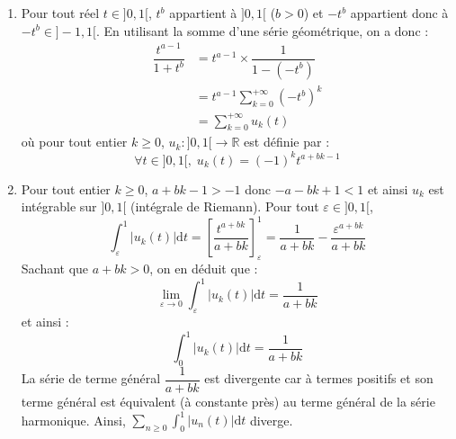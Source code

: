 \documentclass[a4paper,twoside,french,10pt]{VcCours}
\newcommand{\dt}{\text{d}t}
\begin{document}
\begin{enumerate}
\item Pour tout réel $t \in ]0,1[$, $t^b$ appartient à $]0,1[$ ($b>0$) et $-t^b$ appartient donc à $-t^b \in ]-1,1[$. En utilisant la somme d'une série géométrique, on a donc :
\begin{align*}
\dfrac{t^{a-1}}{1+t^b} & = t^{a-1} \times \dfrac{1}{1-(-t^b)} \\
& = t^{a-1} \sum_{k=0}^{+ \infty} (-t^b)^k \\
& = \sum_{k=0}^{+ \infty} u_k(t)
\end{align*}
où pour tout entier $k \geq 0$, $u_k : ]0,1[ \rightarrow \mathbb{R}$ est définie par :
$$ \forall t \in ]0,1[, \; u_k(t) = (-1)^k t^{a+bk-1}$$
\item Pour tout entier $k \geq 0$, $a+bk-1>-1$ donc $-a-bk+1<1$ et ainsi $u_k$ est intégrable sur $]0,1[$ (intégrale de Riemann). Pour tout $\varepsilon \in ]0,1[$,
$$ \int_{\varepsilon}^1 \vert u_k(t) \vert \dt = \left[ \dfrac{t^{a+bk}}{a+bk} \right]_{\varepsilon}^1 =\dfrac{1}{a+bk} - \dfrac{\varepsilon^{a+bk}}{a+bk}$$
Sachant que $a+bk>0$, on en déduit que :
$$ \lim_{\varepsilon \rightarrow 0}  \int_{\varepsilon}^1 \vert u_k(t) \vert \dt  = \dfrac{1}{a+bk}$$
et ainsi :
$$ \int_0^1 \vert u_k(t) \vert \dt = \dfrac{1}{a+bk}$$
La série de terme général $ \dfrac{1}{a+bk}$ est divergente car à termes positifs et son terme général est équivalent (à constante près) au terme général de la série harmonique. Ainsi, $\sum_{n \geq 0} \int_0^1 \vert u_n(t) \vert \dt$ diverge.

\medskip


\end{enumerate}
\end{document}
